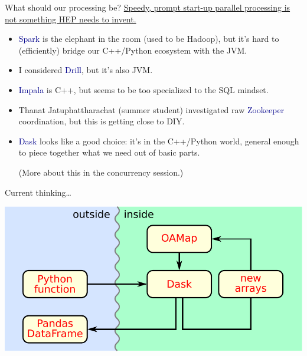 \documentclass[aspectratio=169]{beamer}
\begin{document}
\begin{frame}{What should our processing be?}
\vspace{0.5 cm}
\underline{Speedy, prompt start-up parallel processing is not something HEP needs to invent.}

\vspace{0.25 cm}
\begin{itemize}\setlength{\itemsep}{0.25 cm}
\item<2-> \textcolor{darkblue}{Spark} is the elephant in the room (used to be Hadoop), but it's hard to (efficiently) bridge our C++/Python ecosystem with the JVM.

\item<3-> I considered \textcolor{darkblue}{Drill}, but it's also JVM.

\item<4-> \textcolor{darkblue}{Impala} is C++, but seems to be too specialized to the SQL mindset.

\item<5-> Thanat Jatuphattharachat (summer student) investigated raw \textcolor{darkblue}{Zookeeper} coordination, but this is getting close to DIY.

\item<6-> \textcolor{darkblue}{Dask} looks like a good choice: it's in the C++/Python world, general enough to piece together what we need out of basic parts.

\vspace{0.25 cm}
(More about this in the concurrency session.)
\end{itemize}
\end{frame}

\begin{frame}{Current thinking\ldots}
\vspace{0.5 cm}
\begin{center}
\includegraphics[width=0.7\linewidth]{block-diagram-processing.pdf}
\end{center}
\end{frame}
\end{document}
